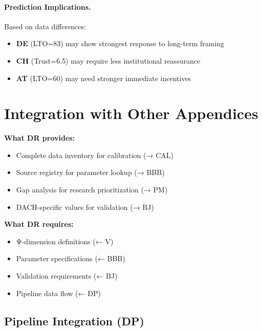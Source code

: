 \paragraph{Prediction Implications.}

Based on data differences:
\begin{itemize}
\item \textbf{DE} (LTO=83) may show strongest response to long-term framing
\item \textbf{CH} (Trust=6.5) may require less institutional reassurance
\item \textbf{AT} (LTO=60) may need stronger immediate incentives
\end{itemize}


\section{Integration with Other Appendices}
\label{sec:dr-integration}

\begin{tcolorbox}[colback=yellow!5!white, colframe=yellow!75!black,
    title=Integration: DR $\leftrightarrow$ Pipeline Appendices]

\textbf{What DR provides:}
\begin{itemize}[nosep]
\item Complete data inventory for calibration (→ CAL)
\item Source registry for parameter lookup (→ BBB)
\item Gap analysis for research prioritization (→ PM)
\item DACH-specific values for validation (→ BJ)
\end{itemize}

\textbf{What DR requires:}
\begin{itemize}[nosep]
\item Ψ-dimension definitions (← V)
\item Parameter specifications (← BBB)
\item Validation requirements (← BJ)
\item Pipeline data flow (← DP)
\end{itemize}

\end{tcolorbox}

\subsection{Pipeline Integration (DP)}

